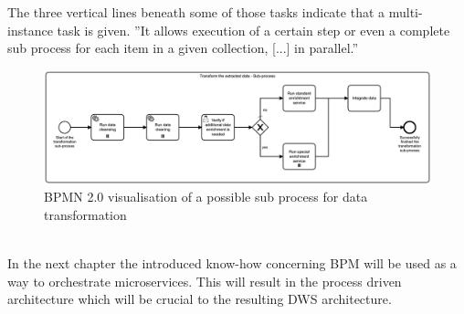 The three vertical lines beneath some of those tasks indicate that a multi-instance task is given. ''It allows execution of a certain step or even a complete sub process for each item in a given collection, [...] in parallel.'' \cite{bpmMultiInstance} \newline
\begin{figure}[!htb]
    \centering
    \includegraphics[scale=0.13]{pictures/DataTransformationSubprocess.png}
    \caption{BPMN 2.0 visualisation of a possible sub process for data transformation}
    \label{fig:BPMNdatatransformation}
\end{figure}
\\
In the next chapter the introduced know-how concerning BPM will be used as a way to orchestrate microservices. This will result in the process driven architecture which will be crucial to the resulting DWS architecture.

